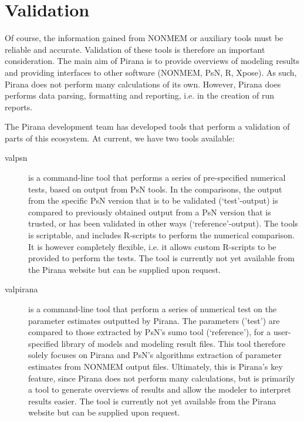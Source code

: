 {{{{%
\newpage  %
\thispagestyle{empty}
\mbox{}

\chapter{Validation}
Of course, the information gained from NONMEM or auxiliary tools must be
reliable and accurate. Validation of these tools is therefore an important consideration. 
The main aim of Pirana is to provide overviews of modeling results and
providing interfaces to other software (NONMEM, PsN, R, Xpose). As such, Pirana does not perform many calculations of its own. However,
Pirana does performs data parsing, formatting and reporting, i.e. in the creation of run reports. 

\noindent The Pirana development team has developed tools that perform a validation of parts of this
ecosystem. At current, we have two tools available:

\begin{description}
\item[valpsn] is a command-line tool that performs a
  series of pre-specified numerical tests, based on output from PsN
  tools. In the comparisons, the output from the specific PsN version
  that is to be validated (`test'-output) is compared to previously
  obtained output from a PsN version that is trusted, or has been
  validated in other ways (`reference'-output). The tools is
  scriptable, and includes R-scripts to perform the numerical
  comparison. It is however completely flexible, i.e. it allows custom
  R-scripts to be provided to perform the tests. The tool is currently
  not yet available from the Pirana website but can be supplied upon request.
\item[valpirana] is a command-line tool that perform a
  series of numerical test on the parameter estimates outputted by
  Pirana. The parameters ('test') are compared to those extracted by
  PsN's sumo tool (`reference'), for a user-specified library of
  models and modeling result files. This tool therefore solely focuses
  on Pirana and PsN's algorithms extraction of parameter estimates
  from NONMEM output files. Ultimately, this is Pirana's key feature,
  since Pirana does not perform many calculations, but is primarily a
  tool to generate overviews of results and allow the modeler to
  interpret results easier. The tool is currently
  not yet available from the Pirana website but can be supplied upon request.
\end{description} 

}}}}
